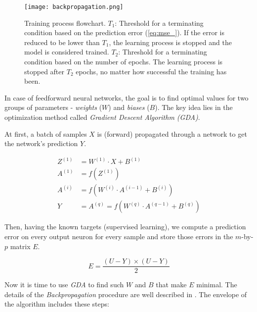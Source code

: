 \begin{figure}[H]
  \centering
  \texttt{[image: backpropagation.png]}
  \caption{Training process flowchart. $ T_1 $: Threshold for a terminating condition based on the prediction error (\cref{eq:mse_}). If the error is reduced to be lower than $ T_1 $, the learning process is stopped and the model is considered trained. $ T_2 $: Threshold for a terminating condition based on the number of epochs. The learning process is stopped after $ T_2 $ epochs, no matter how successful the training has been.}
  \label{fig:methods:backpropagation}
\end{figure}

In case of feedforward neural networks, the goal is to find optimal values for two groups of parameters - \textit{weights} ($ W $) and \textit{biases} ($ B $). The key idea lies in the optimization method called \textit{Gradient Descent Algorithm (GDA)}.

At first, a batch of samples $ X $ is (forward) propagated through a network to get the network's prediction $ Y $.

\begin{align}
Z^{(1)} &= W^{(1)} \cdot X + B^{(1)} \\
A^{(1)} &= f(Z^{(1)}) \\
A^{(i)} &= f(W^{(i)} \cdot A^{(i-1)} + B^{(i)}) \\
Y &= A^{(q)} = f(W^{(q)} \cdot A^{(q-1)} + B^{(q)})
\end{align}

Then, having the known targets (supervised learning), we compute a prediction error on every output neuron for every sample and store those errors in the $ m $-by-$ p $ matrix $ E $.

\begin{equation} \label{eq:prediction_error}
E = \frac{(U - Y) \times (U - Y)}{2}
\end{equation}

Now it is time to use \textit{GDA} to find such $ W $ and $ B $ that make $ E $ minimal. The details of the \textit{Backpropagation} procedure are well described in \citep{online:nnanddl}. The envelope of the algorithm includes these steps:

